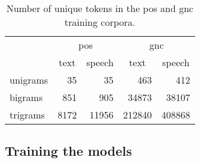 \begin{table}[!htbp]
	\centering
	\caption{Number of unique tokens in the pos and gnc training corpora.}
	\begin{tabular*}{.6\linewidth}{@{\extracolsep{\fill}}l*4r}
		{}        &  \multicolumn{2}{c}{pos} & \multicolumn{2}{c}{gnc}\\
		\cmidrule{2-5}
		{}        &  \multicolumn{1}{c}{text} & \multicolumn{1}{c}{speech} & \multicolumn{1}{c}{text} & \multicolumn{1}{c}{speech} \\
		\cmidrule{2-5}
		unigrams  &  35   & 35     & 463     & 412    \\
	        bigrams   &  851  & 905    & 34873   & 38107  \\
                trigrams  &  8172 & 11956  & 212840  & 408868 \\
	\end{tabular*}
\end{table}

\subsection{Training the models}

